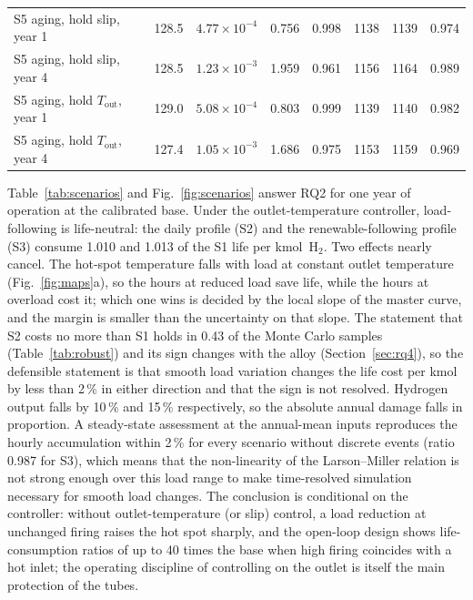 \documentclass[final,3p,times]{elsarticle}
\begin{document}
\begin{table}[t]
{\begin{tabular}{lccccccc}
S5 aging, hold slip, year 1      & 128.5 & $4.77\times10^{-4}$ & 0.756 & 0.998 & 1138 & 1139 & 0.974 \\
S5 aging, hold slip, year 4      & 128.5 & $1.23\times10^{-3}$ & 1.959 & 0.961 & 1156 & 1164 & 0.989 \\
S5 aging, hold $T_{\mathrm{out}}$, year 1 & 129.0 & $5.08\times10^{-4}$ & 0.803 & 0.999 & 1139 & 1140 & 0.982 \\
S5 aging, hold $T_{\mathrm{out}}$, year 4 & 127.4 & $1.05\times10^{-3}$ & 1.686 & 0.975 & 1153 & 1159 & 0.969 \\
\bottomrule
\end{tabular}}
\end{table}

Table~\ref{tab:scenarios} and Fig.~\ref{fig:scenarios} answer RQ2 for one year of operation at the calibrated base. Under the outlet-temperature controller, load-following is life-neutral: the daily profile (S2) and the renewable-following profile (S3) consume 1.010 and 1.013 of the S1 life per kmol~H$_2$. Two effects nearly cancel. The hot-spot temperature falls with load at constant outlet temperature (Fig.~\ref{fig:maps}a), so the hours at reduced load save life, while the hours at overload cost it; which one wins is decided by the local slope of the master curve, and the margin is smaller than the uncertainty on that slope. The statement that S2 costs no more than S1 holds in 0.43 of the Monte Carlo samples (Table~\ref{tab:robust}) and its sign changes with the alloy (Section~\ref{sec:rq4}), so the defensible statement is that smooth load variation changes the life cost per kmol by less than 2\,\% in either direction and that the sign is not resolved. Hydrogen output falls by 10\,\% and 15\,\% respectively, so the absolute annual damage falls in proportion. A steady-state assessment at the annual-mean inputs reproduces the hourly accumulation within 2\,\% for every scenario without discrete events (ratio 0.987 for S3), which means that the non-linearity of the Larson--Miller relation is not strong enough over this load range to make time-resolved simulation necessary for smooth load changes. The conclusion is conditional on the controller: without outlet-temperature (or slip) control, a load reduction at unchanged firing raises the hot spot sharply, and the open-loop design shows life-consumption ratios of up to 40 times the base when high firing coincides with a hot inlet; the operating discipline of controlling on the outlet is itself the main protection of the tubes.
\end{document}
